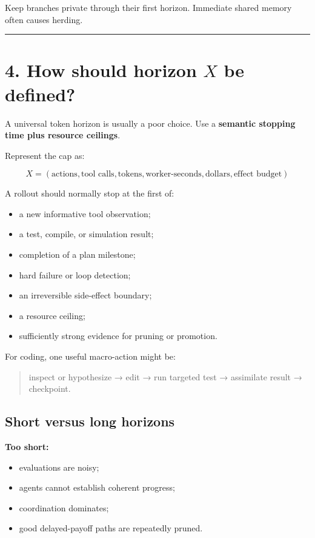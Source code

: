 \documentclass[
  letterpaper,
]{article}
\providecommand{\tightlist}{%
  \setlength{\itemsep}{0pt}\setlength{\parskip}{0pt}}
\begin{document}
Keep branches private through their first horizon. Immediate shared memory often causes herding.

\begin{center}\rule{0.5\linewidth}{0.5pt}\end{center}

\section{\texorpdfstring{4. How should horizon \(X\) be defined?}{4. How should horizon X be defined?}}\label{how-should-horizon-x-be-defined}

A universal token horizon is usually a poor choice. Use a \textbf{semantic stopping time plus resource ceilings}.

Represent the cap as:

\[
X=(\text{actions},\text{tool calls},\text{tokens},
\text{worker-seconds},\text{dollars},\text{effect budget})
\]

A rollout should normally stop at the first of:

\begin{itemize}
\tightlist
\item
  a new informative tool observation;
\item
  a test, compile, or simulation result;
\item
  completion of a plan milestone;
\item
  hard failure or loop detection;
\item
  an irreversible side-effect boundary;
\item
  a resource ceiling;
\item
  sufficiently strong evidence for pruning or promotion.
\end{itemize}

For coding, one useful macro-action might be:

\begin{quote}
inspect or hypothesize → edit → run targeted test → assimilate result → checkpoint.
\end{quote}

\subsection{Short versus long horizons}\label{short-versus-long-horizons}

\textbf{Too short:}

\begin{itemize}
\tightlist
\item
  evaluations are noisy;
\item
  agents cannot establish coherent progress;
\item
  coordination dominates;
\item
  good delayed-payoff paths are repeatedly pruned.
\end{itemize}
\end{document}
